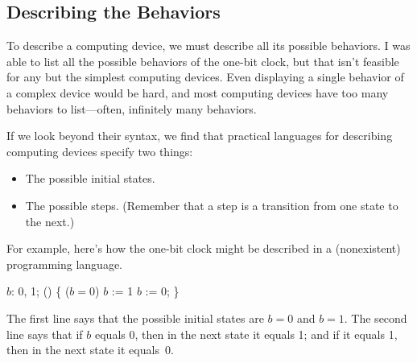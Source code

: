 \documentclass[fleqn,leqno]{article}
\begin{document}
% 


\subsection{Describing the Behaviors}

To describe a computing device, we must describe all its possible
behaviors.  I was able to list all the possible behaviors of the
one-bit clock, but that isn't feasible for any but the simplest
computing devices.  Even displaying a single behavior of a complex
device would be hard, and most computing devices have too many
behaviors to list---often, infinitely many behaviors.

If we look beyond their syntax, we find that practical languages for
describing computing devices specify two things:
\begin{itemize}
\item The possible initial states.

\item The possible 
steps.  (Remember that a step is a transition from one state to the
next.)
\end{itemize}
For example, here's how the one-bit clock might be
described in a (nonexistent) programming language.
\begin{program}
 $b$: 0, 1; 
 () \{  ($b=0$) $b$ := 1 
                           $b$ := 0; \} 
\end{program}
The first line says that the possible initial states are $b=0$ and
$b=1$.  The second line says that if $b$ equals 0, then in the next
state it equals 1; and if it equals 1, then in the next state it
equals~0.
\end{document}
